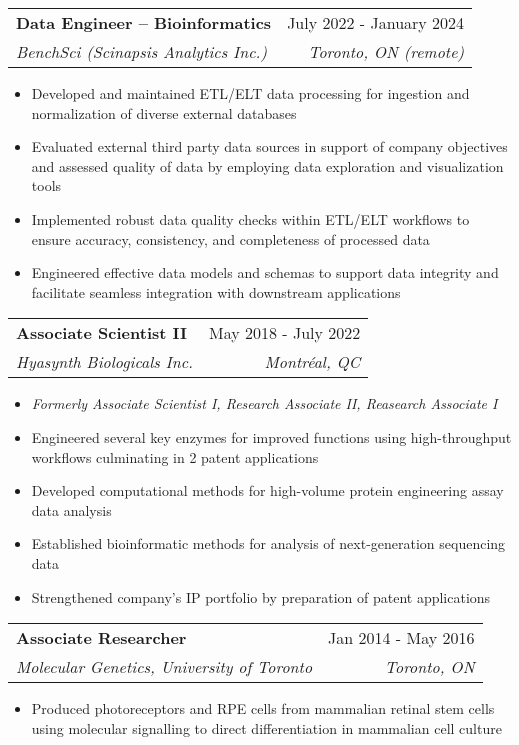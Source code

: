 \documentclass[letterpaper,11pt]{article}
\makeatletter
\newcommand{\resumeItem}[1]{
  \item\small{
    {#1 \vspace{-2pt}}
  }
}
\newcommand{\resumeSubheading}[4]{
  \vspace{-2pt}\item
    \begin{tabular*}{0.97\textwidth}[t]{l@{\extracolsep{\fill}}r}
      \textbf{#1} & #2 \\
      \textit{\small#3} & \textit{\small #4} \\
    \end{tabular*}\vspace{-7pt}
}
\newcommand{\resumeSubSubheading}[2]{
    \item
    \begin{tabular*}{0.97\textwidth}{l@{\extracolsep{\fill}}r}
      \textit{\small#1} & \textit{\small #2} \\
    \end{tabular*}\vspace{-7pt}
}
\newcommand{\resumeSubHeadingListEnd}{\end{itemize}}
\newcommand{\resumeItemListStart}{\begin{itemize}}
\newcommand{\resumeItemListEnd}{\end{itemize}\vspace{-5pt}}
\makeatother
\begin{document}
    \resumeSubheading
      {Data Engineer -- Bioinformatics}{July 2022 - January 2024}
      {BenchSci (Scinapsis Analytics Inc.)}{Toronto, ON \emph(remote)}
      \resumeItemListStart
        \resumeItem{Developed and maintained ETL/ELT data processing for ingestion and normalization of diverse external databases}
        \resumeItem{Evaluated external third party data sources in support of company objectives and assessed quality of data by employing data exploration and visualization tools}
	  \resumeItem{Implemented robust data quality checks within ETL/ELT workflows to ensure accuracy, consistency, and completeness of processed data}
        \resumeItem{Engineered effective data models and schemas to support data integrity and facilitate seamless integration with downstream applications}
    \resumeItemListEnd 

      

    \resumeSubheading
      {Associate Scientist II}{May 2018 - July 2022}
      {Hyasynth Biologicals Inc.}{Montréal, QC}
      \resumeItemListStart
		\resumeItem{\emph{Formerly Associate Scientist I, Research Associate II, Reasearch Associate I}}
		\resumeItem{Engineered several key enzymes for improved functions using high-throughput workflows culminating in 2 patent applications}        	
		\resumeItem{Developed computational methods for high-volume protein engineering assay data analysis}
		\resumeItem{Established bioinformatic methods for analysis of next-generation sequencing data}
        	\resumeItem{Strengthened company's IP portfolio by preparation of patent applications}
		
    \resumeItemListEnd

    \resumeSubheading
      {Associate Researcher}{Jan 2014 - May 2016}
      {Molecular Genetics, University of Toronto}{Toronto, ON}
      \resumeItemListStart
        \resumeItem{Produced photoreceptors and RPE cells from mammalian retinal stem cells using molecular signalling to direct differentiation in mammalian cell culture}
      \resumeItemListEnd
%
\end{document}
